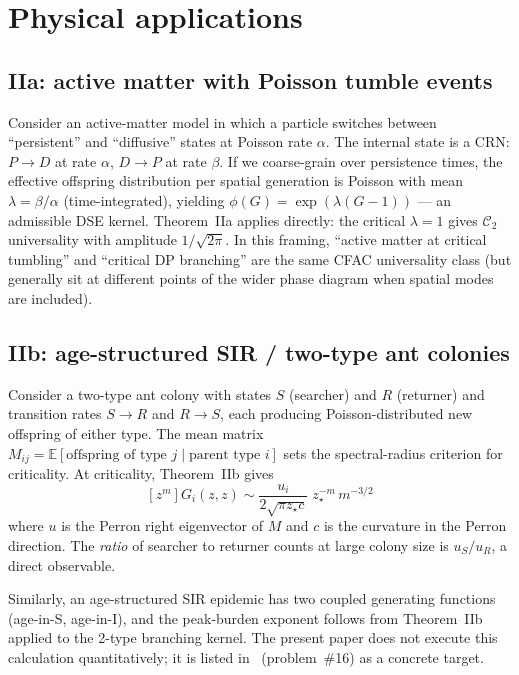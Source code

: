 \documentclass[11pt,a4paper]{article}
\newcommand{\Cstr}[1]{\mathcal{C}_{#1}}
\theoremstyle{plain}
\theoremstyle{definition}
\begin{document}
\section{Physical applications}
\label{sec:applications}

\subsection{IIa: active matter with Poisson tumble events}
\label{sec:active-matter}

Consider an active-matter model in which a particle switches between
``persistent'' and ``diffusive'' states at Poisson rate $\alpha$.  The
internal state is a CRN: $P \to D$ at rate $\alpha$, $D \to P$ at rate
$\beta$.  If we coarse-grain over persistence times, the effective
offspring distribution per spatial generation is Poisson with mean
$\lambda = \beta/\alpha$ (time-integrated), yielding
$\phi(G) = \exp(\lambda(G-1))$ --- an admissible DSE kernel.
Theorem~IIa applies directly: the critical $\lambda = 1$ gives
$\Cstr{2}$ universality with amplitude $1/\sqrt{2\pi}$.  In this
framing, ``active matter at critical tumbling'' and ``critical
DP branching'' are the same CFAC universality class (but generally
sit at different points of the wider phase diagram when spatial
modes are included).

\subsection{IIb: age-structured SIR / two-type ant colonies}

Consider a two-type ant colony with states $S$ (searcher) and $R$
(returner) and transition rates $S \to R$ and $R \to S$, each
producing Poisson-distributed new offspring of either type.  The
mean matrix $M_{ij} = \mathbb{E}[\text{offspring of type } j \mid \text{parent
type } i]$ sets the spectral-radius criterion for criticality.  At
criticality, Theorem~IIb gives
\[
  [z^m] G_i(z, z) \sim \frac{u_i}{2\sqrt{\pi z_\star c}}\; z_\star^{-m}\, m^{-3/2}
\]
where $u$ is the Perron right eigenvector of $M$ and $c$ is the
curvature in the Perron direction.  The \emph{ratio} of searcher to
returner counts at large colony size is $u_S/u_R$, a direct
observable.

Similarly, an age-structured SIR epidemic has two coupled
generating functions (age-in-S, age-in-I), and the peak-burden
exponent follows from Theorem~IIb applied to the 2-type branching
kernel.  The present paper does not execute this calculation
quantitatively; it is listed in~\citep{AmarteifioProblems2026}
(problem~\#16) as a concrete target.
\end{document}
